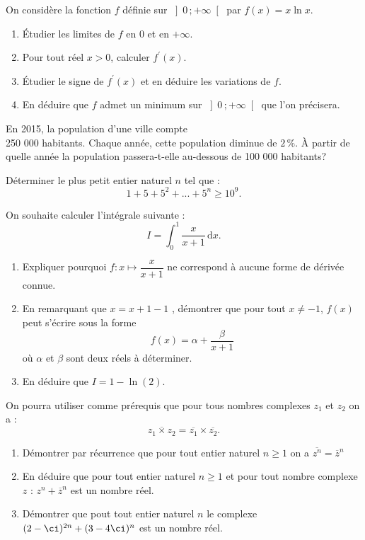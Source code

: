 \begin{question}[topic=logarithme]
  On considère la fonction $f$ définie sur $ \left] 0 \, ;+\infty \right[ $
  par $f(x)=x \ln x$.
  \begin{enumerate}
    \item Étudier les limites de $f$ en 0 et en $+\infty$.
    \item Pour tout réel $x>0$, calculer $f^{\prime}(x)$.
    \item Étudier le signe de  $f^{\prime}(x)$ et en déduire les variations
      de $f$.
    \item En déduire que $f$ admet un minimum sur $\left] 0 \,
      ;+\infty\right[ $ que l'on précisera.
\end{enumerate}
\end{question}

\begin{question}[topic=logarithme]
  En 2015, la population d'une ville compte \\250 000 habitants. Chaque
  année, cette population diminue de $2 \, \%$. À partir de quelle année la
  population passera-t-elle au-dessous de 100 000 habitants?
\end{question}

\begin{question}[topic=logarithme]
  Déterminer le plus petit entier naturel $n$ tel que :
  \[ 1+5+5^2+...+5^n \geqslant 10^9. \]
\end{question}

\begin{question}[topic=integration]
  On souhaite calculer l'intégrale suivante :
  \[ I = \int_0^1 \dfrac{x}{x+1}\,\mathrm{d}x. \]
  \begin{enumerate}
    \item Expliquer pourquoi $f : x \mapsto \dfrac{x}{x+1}$ ne correspond à
      aucune forme de dérivée connue.
    \item En remarquant que $x = x + 1 - 1$ , démontrer que pour tout $x
      \neq -1$, $f(x)$ peut s'écrire sous la forme \[f(x) = \alpha+
      \dfrac{\beta}{x+1}\] où $\alpha$ et $\beta$ sont deux réels à
      déterminer.
    \item En déduire que $I = 1 - \ln(2)$.
  \end{enumerate}
\end{question}

\begin{question}[topic=complexes]
  On pourra utiliser comme prérequis que pour tous nombres complexes $z_1$
  et $z_2$ on a : $$\overline{z_1\times z_2}=\overline{z_1}\times
  \overline{z_2}.$$
  \begin{enumerate}
    \item Démontrer par récurrence que pour tout entier naturel $n\geqslant
      1$ on a $\overline{z^n}=\overline{z}^n$
    \item En déduire que pour tout entier naturel $n\geqslant 1$ et pour
      tout nombre complexe $z$ : $z^n+\overline{z}^n$ est un nombre réel.
    \item Démontrer que pout tout entier naturel $n$ le complexe
      $(2-\ci)^{2n}+(3-4\ci)^n$ est un nombre réel.
  \end{enumerate}
\end{question}

